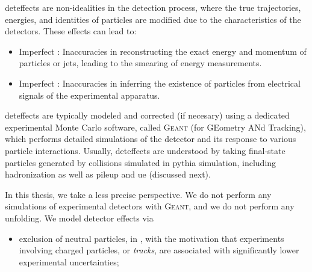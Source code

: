 \begin{subappendices}
\Gls{deteffects} are non-idealities in the detection process, where the true trajectories, energies, and identities of particles are modified due to the characteristics of the detectors.
%
These effects can lead to:
\begin{itemize}
    \item
    Imperfect :
    Inaccuracies in reconstructing the exact energy and momentum of particles or jets, leading to the smearing of energy measurements.

    \item
    Imperfect :
    Inaccuracies in inferring the existence of particles from electrical signals of the experimental apparatus.
\end{itemize}

\Gls{deteffects} are typically modeled and corrected (if necesary) using a dedicated experimental Monte Carlo software, called \textsc{Geant} (for GEometry ANd Tracking), which performs detailed simulations of the detector and its response to various particle interactions.
%
Usually, \gls{deteffects} are understood by taking final-state particles generated by collisions simulated in \gls{pythia} simulation, including \gls{hadronization} as well as \gls{pileup} and \gls{ue} (discussed next).





In this thesis, we take a less precise perspective.
%
We do not perform any simulations of experimental detectors with \textsc{Geant}, and we do not perform any unfolding.
%
We model detector effects via
\begin{itemize}
    \item
        exclusion of neutral particles, in , with the motivation that experiments involving charged particles, or \textit{tracks}, are associated with significantly lower experimental uncertainties;


\end{itemize}
\end{subappendices}

